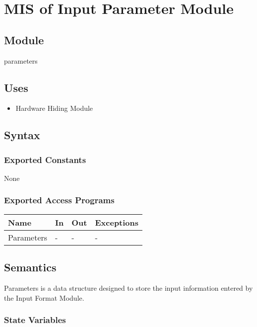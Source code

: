 \documentclass[12pt, titlepage]{article}
\begin{document}
\newpage
\section{MIS of Input Parameter Module} \label{Input_Parameter_Module} 

\subsection{Module}

parameters

\subsection{Uses}

\begin{itemize}
    \item Hardware Hiding Module
\end{itemize}

\subsection{Syntax}

\subsubsection{Exported Constants}
None 

\subsubsection{Exported Access Programs}

\begin{center}
\begin{tabular}{p{2cm} p{4cm} p{4cm} p{2cm}}
\hline
\textbf{Name} & \textbf{In} & \textbf{Out} & \textbf{Exceptions} \\
\hline
Parameters  & - & - & - \\
\hline
\end{tabular}
\end{center}

\subsection{Semantics}
Parameters is a data structure designed to store the input information entered by the Input Format Module. 
\subsubsection{State Variables}
\end{document}
